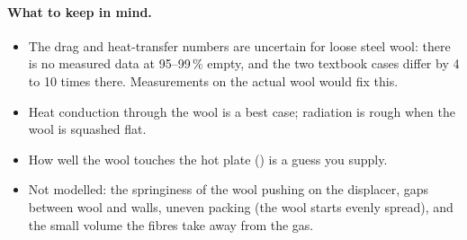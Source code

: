 \paragraph{What to keep in mind.}
\begin{itemize}
    \item The drag and heat-transfer numbers are uncertain for loose steel wool: there is no measured data at 95--99\,\% empty, and the two textbook cases differ by 4 to 10 times there. Measurements on the actual wool would fix this.
    \item Heat conduction through the wool is a best case; radiation is rough when the wool is squashed flat.
    \item How well the wool touches the hot plate () is a guess you supply.
    \item Not modelled: the springiness of the wool pushing on the displacer, gaps between wool and walls, uneven packing (the wool starts evenly spread), and the small volume the fibres take away from the gas.
\end{itemize}

